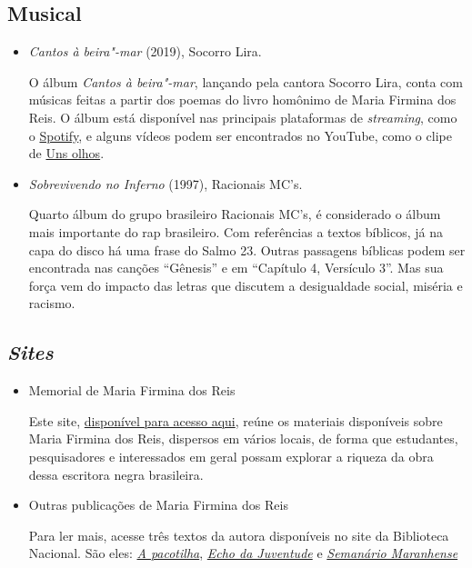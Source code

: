 \documentclass[12pt]{extarticle}
\begin{document}
\subsection{Musical}

\begin{itemize}
\item
\emph{Cantos à beira"-mar} (2019), Socorro Lira.

O álbum \emph{Cantos à beira"-mar}, lançando pela cantora Socorro Lira, conta com músicas feitas a partir dos poemas do livro homônimo de Maria Firmina dos Reis. O álbum está disponível nas principais plataformas de \textit{streaming}, como o \href{https://open.spotify.com/album/0sTj2fx0GaEFGLnDqMjAeJ}{Spotify}, e alguns vídeos podem ser encontrados no YouTube, como o clipe de \href{https://www.youtube.com/watch?v=utEg2Pm4dt4}{Uns olhos}.

\item \emph{Sobrevivendo no Inferno} (1997), Racionais MC's.

Quarto álbum do grupo brasileiro Racionais MC's, é considerado o álbum mais importante do rap brasileiro. Com referências a textos bíblicos, já na capa do disco há uma frase do Salmo 23. Outras passagens bíblicas podem ser encontrada nas canções ``Gênesis'' e em ``Capítulo 4, Versículo 3''. Mas sua força vem do impacto das letras que discutem a desigualdade social, miséria e racismo.

\end{itemize}

\subsection{\emph{Sites}}

\begin{itemize}
\item Memorial de Maria Firmina dos Reis

Este site, \href{https://mariafirmina.org.br/}{disponível para acesso aqui}, reúne os materiais disponíveis sobre Maria Firmina dos Reis, dispersos em vários locais, de forma que estudantes, pesquisadores e interessados em geral possam explorar a riqueza da obra dessa escritora negra brasileira.

\item Outras publicações de Maria Firmina dos Reis 

  Para ler mais, acesse três textos da autora disponíveis no site da
  Biblioteca Nacional. São eles: \href{http://memoria.bn.gov.br/docreader/DocReader.aspx?bib=168319_01\&pagfis=9008}{\emph{A pacotilha}}, \href{http://memoria.bn.gov.br/docreader/DocReader.aspx?bib=738271\&pagfis=48}{\emph{Echo da Juventude}} e \href{http://memoria.bn.gov.br/docreader/DocReader.aspx?bib=720097\&pagfis=214}{\emph{Semanário Maranhense}}
  \end{itemize}
\end{document}
